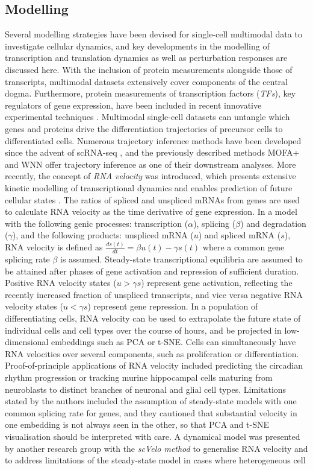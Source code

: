 \documentclass[times, twoside, watermark]{zHenriquesLab-StyleBioRxiv}
\begin{document}
\subsection*{Modelling}
Several modelling strategies have been devised for single-cell multimodal data to investigate cellular dynamics, and key developments in the modelling of transcription and translation dynamics as well as perturbation responses are discussed here. With the inclusion of protein measurements alongside those of transcripts, multimodal datasets extensively cover components of the central dogma. Furthermore, protein measurements of transcription factors (\textit{TFs}), key regulators of gene expression, have been included in recent innovative experimental techniques \cite{Chung2021,Chen2021}. \newline Multimodal single-cell datasets can untangle which genes and proteins drive the differentiation trajectories of precursor cells to differentiated cells. Numerous trajectory inference methods have been developed since the advent of scRNA-seq \cite{Saelens2019}, and the previously described methods MOFA+ and WNN offer trajectory inference as one of their downstream analyses. More recently, the concept of \textit{RNA velocity} was introduced, which presents extensive kinetic modelling of transcriptional dynamics and enables prediction of future cellular states \cite{LaManno2018}. The ratios of spliced and unspliced mRNAs from genes are used to calculate RNA velocity as the time derivative of gene expression. In a model with the following genic processes: transcription ($\alpha$), splicing ($\beta$) and degradation ($\gamma$), and the following products: unspliced mRNA ($u$) and spliced mRNA ($s$), RNA velocity is defined as $\frac{ds(t)}{dt} = \beta u(t)-\gamma s(t)$ where a common gene splicing rate $\beta$ is assumed. Steady-state transcriptional equilibria are assumed to be attained after phases of gene activation and repression of sufficient duration. Positive RNA velocity states ($u > \gamma s$) represent gene activation, reflecting the recently increased fraction of unspliced transcripts, and vice versa negative RNA velocity states ($u < \gamma s$) represent gene repression. In a population of differentiating cells, RNA velocity can be used to extrapolate the future state of individual cells and cell types over the course of hours, and be projected in low-dimensional embeddings such as PCA or t-SNE. Cells can simultaneously have RNA velocities over several components, such as proliferation or differentiation. Proof-of-principle applications of RNA velocity included predicting the circadian rhythm progression or tracking murine hippocampal cells maturing from neuroblasts to distinct branches of neuronal and glial cell types. Limitations stated by the authors included the assumption of steady-state models with one common splicing rate for genes, and they cautioned that substantial velocity in one embedding is not always seen in the other, so that PCA and t-SNE visualisation should be interpreted with care. \newline A dynamical model was presented by another research group with the \textit{scVelo method} to generalise RNA velocity and to address limitations of the steady-state model in cases where heterogeneous cell 
\end{document}

